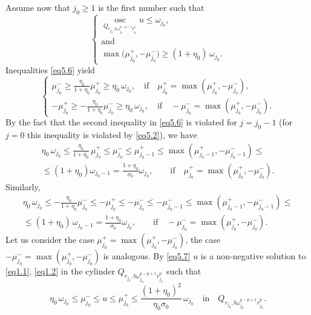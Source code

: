 \documentclass[a4paper,11pt,fullpage]{article}
\DeclareMathOperator*{\osc}{osc}
\numberwithin{equation}{section}
\begin{document}
Assume now that $j_0\geqslant 1$ is the first number such that 
\begin{equation}\label{eq5.6}
\begin{cases}
\osc\limits_{Q_{r_{j_0}, b\,\omega^{q-p+1}_{j_0} r^p_{j_0}}} u\leqslant \omega_{j_0},\\
\text{and}\\
\max\big(\mu^+_{j_0}, -\mu^-_{j_0}\big)\geqslant (1+\eta_0)\,\omega_{j_0}.
\end{cases}
\end{equation}
Inequalities \eqref{eq5.6} yield
$$
\begin{cases}
\mu^-_{j_0}\geqslant \frac{\eta_0}{1+\eta_0}\mu^+_{j_0}\geqslant \eta_0\,\omega_{j_0},\quad \text{if}\quad \mu^+_{j_0}=\max(\mu^+_{j_0}, -\mu^-_{j_0}),\\
-\mu^+_{j_0}\geqslant -\frac{\eta_0}{1+\eta_0} \mu^-_{j_0}\geqslant \eta_0\,\omega_{j_0},\quad \text{if}\quad -\mu^-_{j_0}=\max(\mu^+_{j_0}, -\mu^-_{j_0}).
\end{cases}
$$
By the fact that the second inequality in \eqref{eq5.6} is violated for $j=j_0-1$ (for $j=0$ this inequality is violated by \eqref{eq5.2}), we have
\begin{multline}\label{eq5.7}
\eta_0\,\omega_{j_0}\leqslant \frac{\eta_0}{1+\eta_0}\,\mu^+_{j_0}\leqslant \mu^-_{j_0}\leqslant \mu^+_{j_0-1}\leqslant 
\max(\mu^+_{j_0-1}, -\mu^-_{j_0-1})\leqslant\\\leqslant (1+\eta_0) \omega_{j_0-1}=\frac{1+\eta_0}{\sigma_0}\omega_{j_0},\qquad \text{if}\quad
\mu^+_{j_0}=\max(\mu^+_{j_0}, -\mu^-_{j_0}).
\end{multline}
Similarly,
\begin{multline}\label{eq5.8}
\eta_0\,\omega_{j_0}\leqslant -\frac{\eta_0}{1+\eta_0}\mu^-_{j_0}\leqslant -\mu^+_{j_0}\leqslant -\mu^-_{j_0}\leqslant -\mu^-_{j_0-1}\leqslant \max(\mu^+_{j_0-1}, -\mu^-_{j_0-1})\leqslant\\\leqslant (1+\eta_0)\, \omega_{j_0-1}=\frac{1+\eta_0}{\sigma_0}\omega_{j_0},\qquad \text{if}\quad
-\mu^-_{j_0}=\max(\mu^+_{j_0}, -\mu^-_{j_0}).
\end{multline}
Let us consider the case $\mu^+_{j_0}=\max(\mu^+_{j_0}, -\mu^-_{j_0})$, the  case $-\mu^-_{j_0}=\max(\mu^+_{j_0}, -\mu^-_{j_0})$ is analogous. By \eqref{eq5.7}  $u$ is a non-negative 
solution to \eqref{eq1.1}, \eqref{eq1.2} in the cylinder $Q_{r_{j_0}, b\omega^{q-p+1}_{j_0} r^p_{j_0}}$ such that
\begin{equation}\label{eq5.9}
\eta_0\,\omega_{j_0}\leqslant \mu^-_{j_0}\leqslant u\leqslant\mu^+_{j_0}\leqslant \frac{(1+\eta_0)^2}{\eta_0 \sigma_0}\,\omega_{j_0} \quad \text{in}\quad Q_{r_{j_0}, b\omega^{q-p+1}_{j_0} r^p_{j_0}}.
\end{equation}
\end{document}
